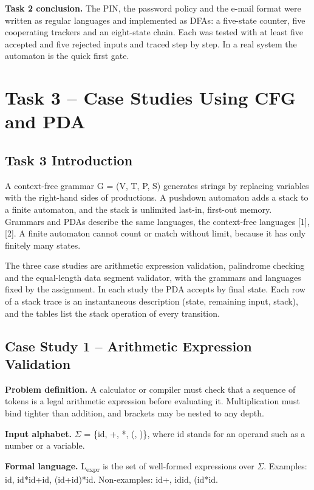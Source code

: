 \documentclass[12pt,a4paper]{article}
\begin{document}
\textbf{Task 2 conclusion.} The PIN, the password policy and the e-mail format were written as regular languages and implemented as DFAs: a five-state counter, five cooperating trackers and an eight-state chain. Each was tested with at least five accepted and five rejected inputs and traced step by step. In a real system the automaton is the quick first gate.

\section{Task 3 -- Case Studies Using CFG and PDA}

\subsection{Task 3 Introduction}

A context-free grammar G = (V, T, P, S) generates strings by replacing variables with the right-hand sides of productions. A pushdown automaton adds a stack to a finite automaton, and the stack is unlimited last-in, first-out memory. Grammars and PDAs describe the same languages, the context-free languages [1], [2]. A finite automaton cannot count or match without limit, because it has only finitely many states.

The three case studies are arithmetic expression validation, palindrome checking and the equal-length data segment validator, with the grammars and languages fixed by the assignment. In each study the PDA accepts by final state. Each row of a stack trace is an instantaneous description (state, remaining input, stack), and the tables list the stack operation of every transition.

\subsection{Case Study 1 -- Arithmetic Expression Validation}

\textbf{Problem definition.} A calculator or compiler must check that a sequence of tokens is a legal arithmetic expression before evaluating it. Multiplication must bind tighter than addition, and brackets may be nested to any depth.

\textbf{Input alphabet.} \ensuremath{\Sigma} = \{id, +, *, (, )\}, where id stands for an operand such as a number or a variable.

\textbf{Formal language.} L\textsubscript{expr} is the set of well-formed expressions over \ensuremath{\Sigma}. Examples: id, id*id+id, (id+id)*id. Non-examples: id+, idid, (id*id.
\end{document}
